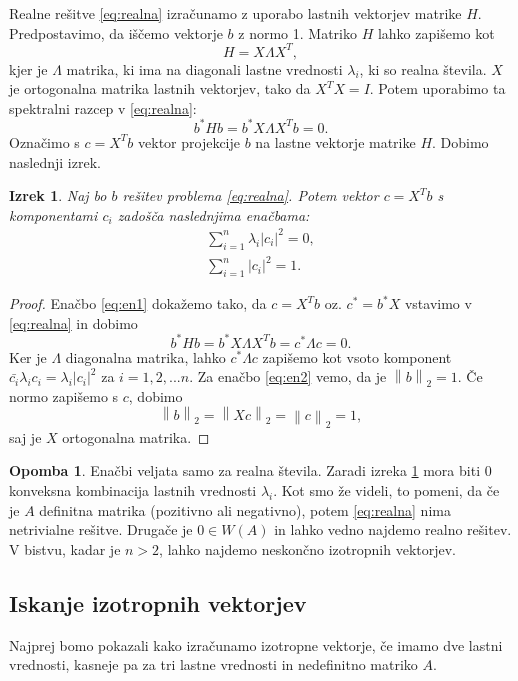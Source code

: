 \documentclass[12pt,a4paper]{amsart}
\theoremstyle{definition}
\newtheorem{opomba}[definicija]{Opomba}
\theoremstyle{plain}
\newtheorem{izrek}[definicija]{Izrek}
\newcommand{\abs}[1]{ \left\lvert#1\right\rvert}
\newcommand{\norm}[1]{\left\lVert#1\right\rVert}
\begin{document}
Realne rešitve \eqref{eq:realna} izračunamo z uporabo lastnih vektorjev matrike $H$. Predpostavimo, da iščemo vektorje $b$ z normo 1. Matriko $H$ lahko zapišemo kot $$H=X\Lambda X^T,$$ kjer je $\Lambda$ matrika, ki ima na diagonali lastne vrednosti $\lambda_i$, ki so realna števila. $X$ je ortogonalna matrika lastnih vektorjev, tako da $X^T X=I$. Potem uporabimo ta spektralni razcep v \eqref{eq:realna}: $$b^\ast Hb=b^\ast X\Lambda X^T b=0.$$ Označimo s $c=X^Tb$ vektor projekcije $b$ na lastne vektorje matrike $H$. Dobimo naslednji izrek.
\begin{izrek} \label{izrek2}\cite{meurant}
Naj bo $b$ rešitev problema \eqref{eq:realna}. Potem vektor $c=X^T b$ s komponentami $c_i$ zadošča naslednjima enačbama:
\begin{align}
\sum_{i=1}^{n} \lambda_i \abs{c_i}^2=0 \label{eq:en1},\\
\sum_{i=1}^{n}\abs{c_i}^2=1. \label{eq:en2}
\end{align}
\end{izrek}
\begin{proof}
Enačbo \eqref{eq:en1}  dokažemo tako, da $c=X^Tb$ oz. $c^\ast =b^\ast X$ vstavimo v \eqref{eq:realna} in dobimo $$b^\ast Hb=b^\ast X\Lambda X^T b= c^\ast \Lambda c=0.$$ Ker je $\Lambda$ diagonalna matrika, lahko $c^\ast \Lambda c$ zapišemo kot vsoto komponent $\bar{c_i}\lambda_i c_i=\lambda_i\abs{c_i}^2$ za $i=1,2,...n$.
Za enačbo \eqref{eq:en2} vemo, da je $\norm{b}_2=1$. Če normo zapišemo s $c$, dobimo $$\norm{b}_2=\norm{Xc}_2=\norm{c}_2=1,$$ saj je $X$ ortogonalna matrika.

\end{proof}
\begin{opomba}
Enačbi veljata samo za realna števila. Zaradi  izreka \ref{izrek2} mora biti 0 konveksna kombinacija lastnih vrednosti $\lambda_i$. Kot smo že videli, to pomeni, da če je $A$ definitna matrika (pozitivno ali negativno), potem \eqref{eq:realna}
nima netrivialne rešitve. Drugače je $0 \in W(A)$ in lahko vedno najdemo realno rešitev. V bistvu, kadar je $n>2$, lahko najdemo neskončno izotropnih vektorjev.
\end{opomba}
\subsection{Iskanje izotropnih vektorjev}
Najprej bomo pokazali kako izračunamo i\-zo\-trop\-ne vektorje, če imamo dve lastni vrednosti, kasneje pa za tri lastne vrednosti in nedefinitno matriko $A$.\\
\end{document}
